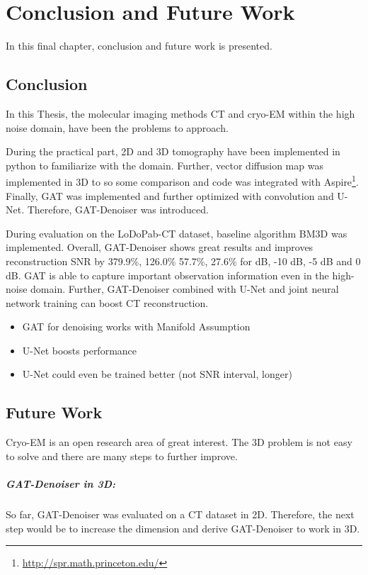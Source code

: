 \chapter{Conclusion and Future Work}
\label{sec:Conclusion}

In this final chapter, conclusion and future work is presented.

\section{Conclusion}

In this Thesis, the molecular imaging methods CT and cryo-EM
within the high noise domain, have been the problems to approach.

During the practical part, 2D and 3D tomography have been implemented 
in python to familiarize with the domain.
Further, vector diffusion map was implemented in 3D to so some comparison
and code was integrated with Aspire\footnote{\url{http://spr.math.princeton.edu/}}.
Finally, GAT was implemented and further optimized with convolution and U-Net.
Therefore, GAT-Denoiser was introduced.

During evaluation on the LoDoPab-CT dataset, baseline algorithm BM3D was implemented.
Overall, GAT-Denoiser shows great results and improves reconstruction SNR 
by 379.9\%, 126.0\% 57.7\%, 27.6\% for  dB, -10 dB, -5 dB and 0 dB.
GAT is able to capture important observation information even in the high-noise domain.
Further, GAT-Denoiser combined with U-Net and joint neural network training
can boost CT reconstruction. 




\begin{itemize}
  \item GAT for denoising works with Manifold Assumption
  \item U-Net boosts performance
  \item U-Net could even be trained better (not SNR interval, longer)
\end{itemize}

\section{Future Work}

Cryo-EM is an open research area of great interest.
The 3D problem is not easy to solve and there are many steps to further improve.

\paragraph{GAT-Denoiser in 3D:}
So far, GAT-Denoiser was evaluated on a CT dataset in 2D.
Therefore, the next step would be to increase the dimension and 
derive GAT-Denoiser to work in 3D. 

